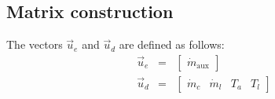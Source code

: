 \subsection{Matrix construction}

The vectors $\vec{u}_e$ and $\vec{u}_d$ are defined as follows:
\begin{eqnarray}
   \vec{u}_e &=& \left[\begin{array}{c} \dot{m}_{\text{aux}} \end{array} \right] \\
   \vec{u}_d &=& \left[\begin{array}{cccc} \dot{m}_c & \dot{m}_l & T_a & T_l \end{array} \right]
\end{eqnarray}

